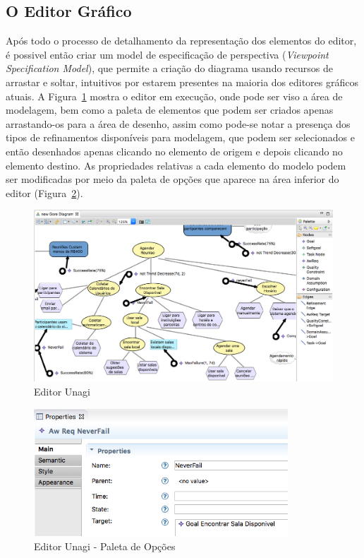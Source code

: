 \subsection{O Editor Gráfico}
\label{sec-unagi-apresentacao-editor}

Após todo o processo de detalhamento da representação dos elementos do editor, é possivel então criar um model de especificação de perspectiva (\textit{Viewpoint Specification Model}), que permite a criação do diagrama usando recursos de arrastar e soltar, intuitivos por estarem presentes na maioria dos editores gráficos atuais. A Figura~\ref{figura-paleta-unagi} mostra o editor em execução, onde pode ser viso a área de modelagem, bem como a paleta de elementos que podem ser criados apenas arrastando-os para a área de desenho, assim como pode-se notar a presença dos tipos de refinamentos disponíveis para modelagem, que podem ser selecionados e então desenhados apenas clicando no elemento de origem e depois clicando no elemento destino. As propriedades relativas a cada elemento do modelo podem ser modificadas por meio da paleta de opções que aparece na área inferior do editor (Figura~\ref{unagi-paleta-opcoes}).

\begin{figure}[h]
	\centering
	\includegraphics[width=1\textwidth]{figuras/unagi/modeloemunagi.png}
	\caption{Editor Unagi}
	\label{figura-paleta-unagi}
\end{figure}

\begin{figure}[h]
	\centering
	\includegraphics[width=0.85\textwidth]{figuras/unagi/paletaopcoes.png}
	\caption{Editor Unagi - Paleta de Opções}
	\label{unagi-paleta-opcoes}
\end{figure}

